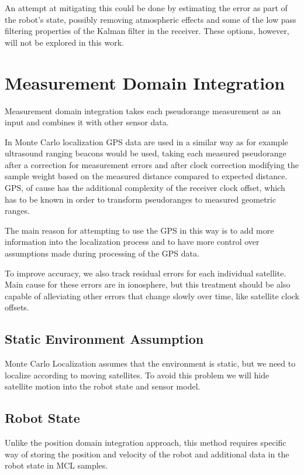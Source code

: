 An attempt at mitigating this could be done by estimating the error as part of
the robot's state, possibly removing atmospheric effects and some of the low pass
filtering properties of the Kalman filter in the receiver.
These options, however, will not be explored in this work.

\section{Measurement Domain Integration}
\label{sec:measurement-domain}

Measurement domain integration takes each pseudorange measurement as an input
and combines it with other sensor data.

In Monte Carlo localization GPS data are used in a similar way as
for example ultrasound ranging beacons would be used,
taking each measured pseudorange after a correction for measurement errors
and after clock correction modifying the sample weight based on the measured distance
compared to expected distance.
GPS, of cause has the additional complexity of the receiver clock offset, which
has to be known in order to transform pseudoranges to measured geometric ranges.

The main reason for attempting to use the GPS in this way is to add more information
into the localization process and to have more control over assumptions made during
processing of the GPS data.

To improve accuracy, we also track residual errors for each individual satellite.
Main cause for these errors are in ionosphere, but this treatment should be also
capable of alleviating other errors that change slowly over time, like satellite
clock offsets.

\subsection{Static Environment Assumption}
\label{sec:gps-mcl-static-env}
Monte Carlo Localization assumes that the environment is static, but we need to
localize according to moving satellites.
To avoid this problem we will hide satellite motion into the robot state and sensor model.

\subsection{Robot State}
Unlike the position domain integration approach, this method requires specific
way of storing the position and velocity of the robot and
additional data in the robot state in MCL samples.

